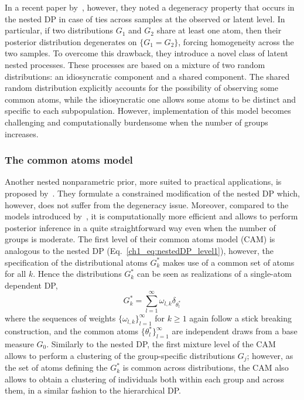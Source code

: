 In a recent paper by~\citet{camerlenghi2019}, however, they noted a degeneracy property that occurs in the nested DP in case of  ties across samples at the observed or latent level.
In particular, if two distributions $G_1$ and $G_2$ share at least one atom, then their posterior distribution degenerates on
$\{G_1=G_2\}$, forcing homogeneity across the two samples. 
To overcome this drawback, they introduce a novel class of latent nested processes.
These processes are based on a mixture of two random distributions: an idiosyncratic component and a shared component. 
The shared random distribution explicitly accounts for the possibility of observing some common atoms, while the idiosyncratic one
allows some atoms to be distinct and specific to each subpopulation.
However, implementation of this model becomes challenging and computationally burdensome when the number of groups increases.

\subsubsection*{The common atoms model}
Another nested nonparametric prior, more suited to practical applications, is proposed by~\citet{denti2021}. They formulate a constrained modification of the nested DP which, however, does not suffer from the degeneracy issue. Moreover, compared to the models introduced by~\citet{camerlenghi2019}, it is computationally more efficient and allows to perform posterior inference in a quite straightforward way even when the number of groups is moderate.
%
The first level of their common atoms model (CAM) is analogous to the nested DP (Eq.~\ref{ch1_eq:nestedDP_level1}), however, the specification of the distributional atoms $G^*_k$ makes use of a common set of atoms for all $k$. Hence the distributions $G^*_k$ can be seen as realizations of a single-atom dependent DP,
\begin{equation*}
G^*_k = \sum_{l=1}^{\infty} \omega_{l,k} \delta_{\theta^*_{l}} 
\end{equation*}
where the sequences of weights $\{\omega_{l,k}\}_{l=1}^{\infty}$ for $k\geq1$ again follow a stick breaking construction, and the common atoms $\{\theta^*_l\}_{l=1}^{\infty}$ are independent draws from a base measure $G_0$.
Similarly to the nested DP, the first mixture level of the CAM allows to perform a clustering of the group-specific distributions $G_j$; however, as the set of atoms defining the $G^*_k$ is common across distributions, the CAM also allows to obtain a clustering of individuals both within each group and across them, in a similar fashion to the hierarchical DP.

